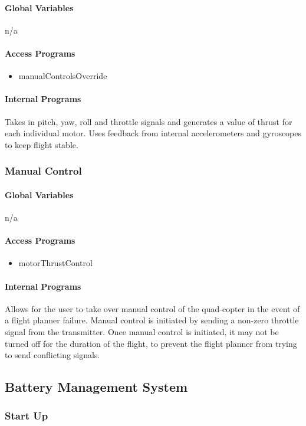 \documentclass[10pt,letterpaper]{article}
\begin{document}
\paragraph{Global Variables}
n/a
\paragraph{Access Programs}
\begin{itemize}
\item manualControlsOverride
\end{itemize}
\paragraph{Internal Programs}
Takes in pitch, yaw, roll and throttle signals and generates a value of thrust for each individual motor. Uses feedback from internal accelerometers and gyroscopes to keep flight stable.

\subsubsection{Manual Control}
\paragraph{Global Variables}
n/a
\paragraph{Access Programs}
\begin{itemize}
\item motorThrustControl
\end{itemize}
\paragraph{Internal Programs}
Allows for the user to take over manual control of the quad-copter in the event of a flight planner failure. Manual control is initiated by sending a non-zero throttle signal from the transmitter. Once manual control is initiated, it may not be turned off for the duration of the flight, to prevent the flight planner from trying to send conflicting signals.


\subsection{Battery Management System}
\subsubsection{Start Up}
\end{document}
